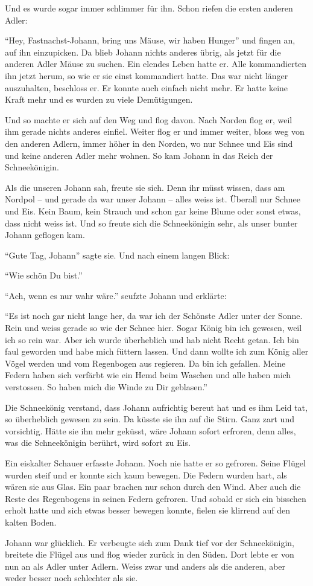 Und es wurde sogar immer schlimmer für ihn. Schon riefen die ersten anderen Adler:

\enquote{Hey, Fastnachst-Johann, bring uns Mäuse, wir haben Hunger} und fingen an, auf ihn einzupicken. Da blieb Johann nichts anderes übrig, als jetzt für die anderen Adler Mäuse zu suchen. Ein elendes Leben hatte er. Alle kommandierten ihn jetzt herum, so wie er sie einst kommandiert hatte. Das war nicht länger auszuhalten, beschloss er. Er konnte auch einfach nicht mehr. Er hatte keine Kraft mehr und es wurden zu viele Demütigungen.

Und so machte er sich auf den Weg und flog davon. Nach Norden flog er, weil ihm gerade nichts anderes einfiel. Weiter flog er und immer weiter, bloss weg von den anderen Adlern, immer höher in den Norden, wo nur Schnee und Eis sind und keine anderen Adler mehr wohnen. So kam Johann in das Reich der Schneekönigin.

Als die unseren Johann sah, freute sie sich. Denn ihr müsst wissen, dass am Nordpol -- und gerade da war unser Johann -- alles weiss ist. Überall nur Schnee und Eis. Kein Baum, kein Strauch und schon gar keine Blume oder sonst etwas, dass nicht weiss ist. Und so freute sich die Schneekönigin sehr, als unser bunter Johann geflogen kam. 

\enquote{Gute Tag, Johann} sagte sie. Und nach einem langen Blick: 

\enquote{Wie schön Du bist.} 

\enquote{Ach, wenn es nur wahr wäre.} seufzte Johann und erklärte: 

\enquote{Es ist noch gar nicht lange her, da war ich der Schönste Adler unter der Sonne. Rein und weiss gerade so wie der Schnee hier. Sogar König bin ich gewesen, weil ich so rein war. Aber ich wurde überheblich und hab nicht Recht getan. Ich bin faul geworden und habe mich füttern lassen. Und dann wollte ich zum König aller Vögel werden und vom Regenbogen aus regieren. Da bin ich gefallen. Meine Federn haben sich verfärbt wie ein Hemd beim Waschen und alle haben mich verstossen. So haben mich die Winde zu Dir geblasen.}

Die Schneekönig verstand, dass Johann aufrichtig bereut hat und es ihm Leid tat, so überheblich gewesen zu sein. Da küsste sie ihn auf die Stirn. Ganz zart und vorsichtig. Hätte sie ihn mehr geküsst, wäre Johann sofort erfroren, denn alles, was die Schneekönigin berührt, wird sofort zu Eis. 

Ein eiskalter Schauer erfasste Johann. Noch nie hatte er so gefroren. Seine Flügel wurden steif und er konnte sich kaum bewegen. Die Federn wurden hart, als wären sie aus Glas. Ein paar brachen nur schon durch den Wind. Aber auch die Reste des Regenbogens in seinen Federn gefroren. Und sobald er sich ein bisschen erholt hatte und sich etwas besser bewegen konnte, fielen sie klirrend auf den kalten Boden.

Johann war glücklich. Er verbeugte sich zum Dank tief vor der Schneekönigin, breitete die Flügel aus und flog wieder zurück in den Süden. Dort lebte er von nun an als Adler unter Adlern. Weiss zwar und anders als die anderen, aber weder besser noch schlechter als sie. \hfill {\color{red}\decofourleft}
